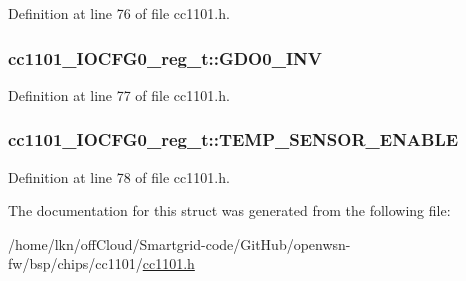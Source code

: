 Definition at line 76 of file cc1101.\+h.

\subsubsection[{\texorpdfstring{G\+D\+O0\+\_\+\+I\+NV}{GDO0_INV}}]{ cc1101\+\_\+\+I\+O\+C\+F\+G0\+\_\+reg\+\_\+t\+::\+G\+D\+O0\+\_\+\+I\+NV}\hypertarget{structcc1101___i_o_c_f_g0__reg__t_a4bde9f877c42a94b958e322546fc10f2}{}\label{structcc1101___i_o_c_f_g0__reg__t_a4bde9f877c42a94b958e322546fc10f2}


Definition at line 77 of file cc1101.\+h.

\subsubsection[{\texorpdfstring{T\+E\+M\+P\+\_\+\+S\+E\+N\+S\+O\+R\+\_\+\+E\+N\+A\+B\+LE}{TEMP_SENSOR_ENABLE}}]{ cc1101\+\_\+\+I\+O\+C\+F\+G0\+\_\+reg\+\_\+t\+::\+T\+E\+M\+P\+\_\+\+S\+E\+N\+S\+O\+R\+\_\+\+E\+N\+A\+B\+LE}\hypertarget{structcc1101___i_o_c_f_g0__reg__t_a9847aa32cc08da389456b7cfe9bc151b}{}\label{structcc1101___i_o_c_f_g0__reg__t_a9847aa32cc08da389456b7cfe9bc151b}


Definition at line 78 of file cc1101.\+h.



The documentation for this struct was generated from the following file\+:\begin{DoxyCompactItemize}
\item 
/home/lkn/off\+Cloud/\+Smartgrid-\/code/\+Git\+Hub/openwsn-\/fw/bsp/chips/cc1101/\hyperlink{cc1101_8h}{cc1101.\+h}\end{DoxyCompactItemize}
